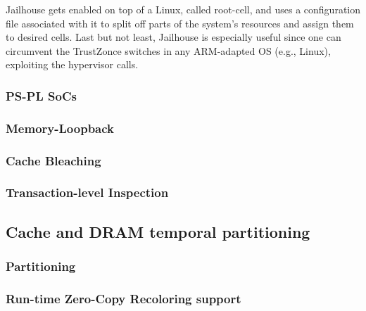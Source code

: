 Jailhouse gets enabled on top of a Linux, called root-cell, and uses a configuration file associated with it to split off parts of the system's resources and assign them to desired cells. Last but not least, Jailhouse is especially useful since one can circumvent the TrustZonce switches in any ARM-adapted OS (e.g., Linux), exploiting the hypervisor calls.

\subsubsection{PS-PL SoCs}
\subsubsection{Memory-Loopback}
\subsubsection{Cache Bleaching}
\subsubsection{Transaction-level Inspection}


\subsection{Cache and DRAM temporal partitioning}

\subsubsection{Partitioning}
        \subsubsection{Run-time Zero-Copy Recoloring support}

